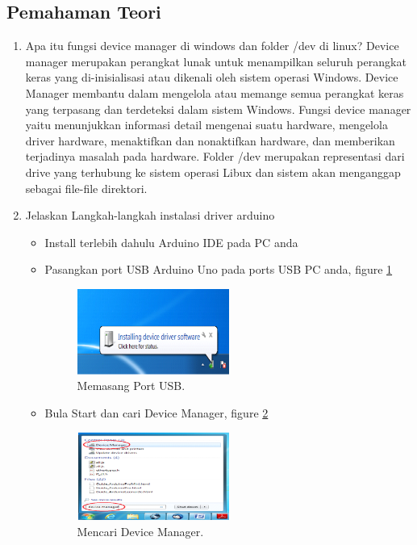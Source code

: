 \subsection{Pemahaman Teori}
\begin{enumerate}

\item Apa itu fungsi device manager di windows dan folder /dev di linux?
	\subitem Device manager merupakan perangkat lunak untuk menampilkan seluruh perangkat keras yang di-inisialisasi atau dikenali oleh sistem operasi Windows. Device Manager membantu dalam mengelola atau memange semua perangkat keras yang terpasang dan terdeteksi dalam sistem Windows. Fungsi device manager yaitu menunjukkan informasi detail mengenai suatu hardware, mengelola driver hardware, menaktifkan dan nonaktifkan hardware, dan memberikan terjadinya masalah pada hardware. Folder /dev merupakan representasi dari drive yang terhubung ke sistem operasi Libux dan sistem akan menganggap sebagai file-file direktori.

\item Jelaskan Langkah-langkah instalasi driver arduino
	\begin{itemize}

	\item Install terlebih dahulu Arduino IDE pada PC anda

	\item Pasangkan port USB Arduino Uno pada ports USB PC anda, figure \ref{YNC5-1}
	
	\begin{figure}[!htbp]
		\centerline{\includegraphics[width=0.5\textwidth]{figures/chapter5/1164089/YNC5-1.png}}
		\caption{Memasang Port USB.}
		\label{YNC5-1}
	\end{figure}	

	\item Bula Start dan cari Device Manager, figure \ref{YNC5-2}

	\begin{figure}[!htbp]
		\centerline{\includegraphics[width=0.5\textwidth]{figures/chapter5/1164089/YNC5-2.png}}
		\caption{Mencari Device Manager.}
		\label{YNC5-2}
	\end{figure}	


\end{itemize}
\end{enumerate}

